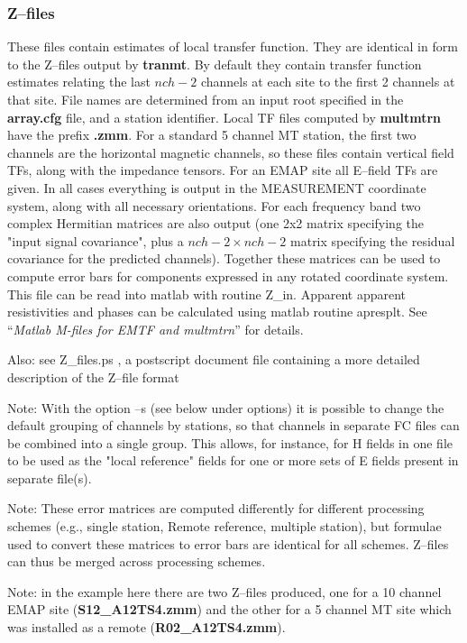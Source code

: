 \subsubsection{Z--files}
 
These files contain estimates of local transfer
function.   They are identical in form to the Z--files
output by {\bf tranmt}.  
By default they contain transfer
function estimates relating the last $nch-2$ channels at each site
to the first 2 channels at that site.  File names are determined
from an input root specified in the {\bf array.cfg} file,
and a station identifier.  Local TF files computed by 
{\bf multmtrn} have the prefix {\bf .zmm}.
For a standard 5 channel 
MT station, the first two channels are the horizontal magnetic
channels, so these files contain vertical field TFs, along with 
the impedance tensors.  For an EMAP site all E--field TFs are given.
In all cases everything is output in the MEASUREMENT coordinate 
system, along with all necessary orientations.   For each frequency
band two complex Hermitian matrices are also output (one 2x2 matrix
specifying the "input signal covariance", plus a $nch-2 \times nch-2$ 
matrix specifying the residual covariance for the predicted channels).
Together these matrices can be used to compute error bars for
components expressed in any rotated coordinate system.
This file can be read into matlab with routine Z\_in.  Apparent
apparent resistivities and phases can be calculated using matlab
routine apresplt.  See ``{\it Matlab M-files for EMTF and multmtrn}''
for details.

\noindent
Also:  see Z\_files.ps , a postscript document file containing a more detailed
description of the Z--file format
 
\noindent
Note: With the option --s (see below under options) it is possible
to change the default grouping of channels by stations, so that
channels in separate FC files can be combined into a single group.
This allows, for instance, for H fields in one file to be used as the "local reference"
fields for one or more sets of E fields present in separate file(s).

\noindent
Note:  These error matrices are computed differently for different
processing schemes (e.g., single station, Remote reference, 
multiple station), but formulae used to convert these matrices
to error bars are identical for all schemes.   Z--files can
thus be merged across processing schemes.  

\noindent
Note: in the example here there are two Z--files produced,
one for a 10 channel EMAP site ({\bf S12\_A12TS4.zmm}) and the other
for a 5 channel MT site which was installed
as a remote ({\bf R02\_A12TS4.zmm}).

